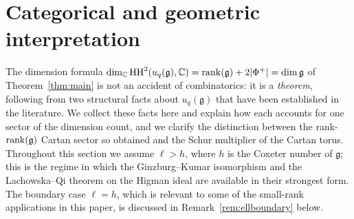 %
%
%
%

\section{Categorical and geometric interpretation}
\label{sec:categorical}

The dimension formula $\dim_{\mathbb{C}} \operatorname{HH}^2(u_q(\mathfrak{g}), \mathbb{C}) = \operatorname{rank}(\mathfrak{g}) + 2|\Phi^+| = \dim \mathfrak{g}$ of Theorem~\ref{thm:main} is not an accident of combinatorics: it is a \emph{theorem}, following from two structural facts about $u_q(\mathfrak{g})$ that have been established in the literature. We collect these facts here and explain how each accounts for one sector of the dimension count, and we clarify the distinction between the rank-$\operatorname{rank}(\mathfrak{g})$ Cartan sector so obtained and the Schur multiplier of the Cartan torus. Throughout this section we assume $\ell > h$, where $h$ is the Coxeter number of $\mathfrak{g}$; this is the regime in which the Ginzburg--Kumar isomorphism and the Lachowska--Qi theorem on the Higman ideal are available in their strongest form. The boundary case $\ell = h$, which is relevant to some of the small-rank applications in this paper, is discussed in Remark~\ref{rem:ellboundary} below.

